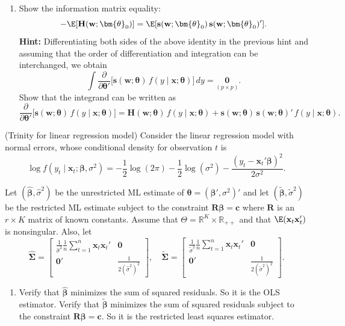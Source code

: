 \begin{problemset}
\begin{enumerate}[label=(\alph*)]
\item Show the information matrix equality:
\[
-\E[\mathbf{H}(\mathbf{w}; \bm{\theta}_0)] = \E[\mathbf{s}(\mathbf{w}; \bm{\theta}_0)\,\mathbf{s}(\mathbf{w}; \bm{\theta}_0)'].
\]
\textbf{Hint:} Differentiating both sides of the above identity in the previous hint and assuming that the order of differentiation and integration can be interchanged, we obtain
\[
\int \frac{\partial}{\partial\bm{\theta}'}\bigl[\mathbf{s}(\mathbf{w}; \bm{\theta})\,f(y \mid \mathbf{x}; \bm{\theta})\bigr]\,dy = \underset{(p \times p)}{\mathbf{0}}.
\]
Show that the integrand can be written as
\[
\frac{\partial}{\partial\bm{\theta}'}\bigl[\mathbf{s}(\mathbf{w}; \bm{\theta})\,f(y \mid \mathbf{x}; \bm{\theta})\bigr] = \mathbf{H}(\mathbf{w}; \bm{\theta})\,f(y \mid \mathbf{x}; \bm{\theta}) + \mathbf{s}(\mathbf{w}; \bm{\theta})\,\mathbf{s}(\mathbf{w}; \bm{\theta})'\,f(y \mid \mathbf{x}; \bm{\theta}).
\]
\end{enumerate}

\exercise[3] (Trinity for linear regression model) \enspace Consider the linear regression model with normal errors, whose conditional density for observation $t$ is
\[
\log f(y_t \mid \mathbf{x}_t; \bm{\beta}, \sigma^2) = -\frac{1}{2}\log(2\pi) - \frac{1}{2}\log(\sigma^2) - \frac{(y_t - \mathbf{x}_t'\bm{\beta})^2}{2\sigma^2}.
\]

Let $(\hat{\bm{\beta}}, \hat{\sigma}^2)$ be the unrestricted ML estimate of $\bm{\theta} = (\bm{\beta}', \sigma^2)'$ and let $(\tilde{\bm{\beta}}, \tilde{\sigma}^2)$ be the restricted ML estimate subject to the constraint $\mathbf{R}\bm{\beta} = \mathbf{c}$ where $\mathbf{R}$ is an $r \times K$ matrix of known constants. Assume that $\Theta = \mathbb{R}^K \times \mathbb{R}_{++}$ and that $\E(\mathbf{x}_t\mathbf{x}_t')$ is nonsingular. Also, let
\[
\hat{\bm{\Sigma}} = \begin{bmatrix} \frac{1}{\hat{\sigma}^2}\frac{1}{n}\sum_{t=1}^{n}\mathbf{x}_t\mathbf{x}_t' & \mathbf{0} \\[4pt] \mathbf{0}' & \frac{1}{2(\hat{\sigma}^2)^2} \end{bmatrix}, \quad \tilde{\bm{\Sigma}} = \begin{bmatrix} \frac{1}{\tilde{\sigma}^2}\frac{1}{n}\sum_{t=1}^{n}\mathbf{x}_t\mathbf{x}_t' & \mathbf{0} \\[4pt] \mathbf{0}' & \frac{1}{2(\tilde{\sigma}^2)^2} \end{bmatrix}.
\]

\begin{enumerate}[label=(\alph*)]
\item Verify that $\hat{\bm{\beta}}$ minimizes the sum of squared residuals. So it is the OLS estimator. Verify that $\tilde{\bm{\beta}}$ minimizes the sum of squared residuals subject to the constraint $\mathbf{R}\bm{\beta} = \mathbf{c}$. So it is the restricted least squares estimator.


\end{enumerate}
\end{problemset}
